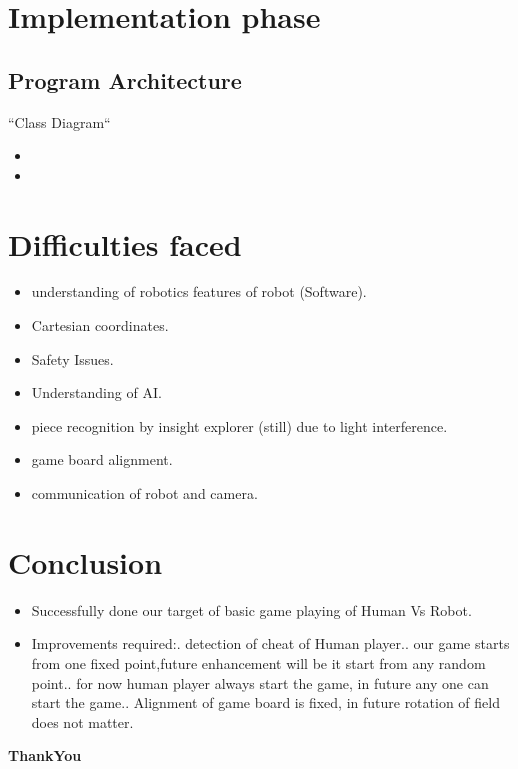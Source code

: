 \documentclass{beamer}
\begin{document}
\section{Implementation phase}
\subsection{Program Architecture}
\begin{frame}
``Class Diagram``
\begin{itemize}
\item 
\item 
\end{itemize}
\end{frame}



\section{Difficulties faced}
\begin{frame}
\begin{itemize}
\item understanding of robotics features of robot (Software).
\item Cartesian coordinates.
\item Safety Issues.
\item Understanding of AI.
\item piece recognition by insight explorer (still) due to light interference.
\item game board alignment.
\item communication of robot and camera.
\end{itemize}
\end{frame}


\section{Conclusion}
\begin{frame}
\begin{itemize}
\item Successfully done our target of basic game playing of Human Vs Robot.
\item Improvements required:. detection of cheat of Human player.. our game starts from one fixed point,future enhancement will be it start from any random point.. for now human player always start the game, in future any one can start the game.. Alignment of game board is fixed, in future rotation of field does not matter.
\end{itemize}
\end{frame}


\begin{frame}
\begin{center}  
\Huge \textbf{ThankYou}
\end{center}
\end{frame}
\end{document}
